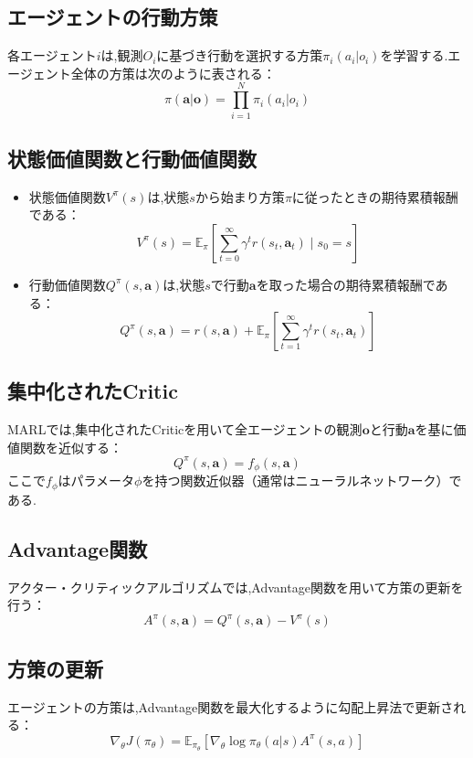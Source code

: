 \subsection*{エージェントの行動方策}
各エージェント$i$は,観測$O_i$に基づき行動を選択する方策$\pi_i(a_i | o_i)$を学習する.エージェント全体の方策は次のように表される：
\[
\pi(\boldsymbol{a} | \boldsymbol{o}) = \prod_{i=1}^N \pi_i(a_i | o_i)
\]

\subsection*{状態価値関数と行動価値関数}
\begin{itemize}
    \item 状態価値関数$V^\pi(s)$は,状態$s$から始まり方策$\pi$に従ったときの期待累積報酬である：
    \[
    V^\pi(s) = \mathbb{E}_\pi \left[ \sum_{t=0}^\infty \gamma^t r(s_t, \boldsymbol{a}_t) \mid s_0 = s \right]
    \]
    \item 行動価値関数$Q^\pi(s, \boldsymbol{a})$は,状態$s$で行動$\boldsymbol{a}$を取った場合の期待累積報酬である：
    \[
    Q^\pi(s, \boldsymbol{a}) = r(s, \boldsymbol{a}) + \mathbb{E}_\pi \left[ \sum_{t=1}^\infty \gamma^t r(s_t, \boldsymbol{a}_t) \right]
    \]
\end{itemize}

\subsection*{集中化されたCritic}
MARLでは,集中化されたCriticを用いて全エージェントの観測$\boldsymbol{o}$と行動$\boldsymbol{a}$を基に価値関数を近似する：
\[
Q^\pi(s, \boldsymbol{a}) = f_\phi(s, \boldsymbol{a})
\]
ここで$f_\phi$はパラメータ$\phi$を持つ関数近似器（通常はニューラルネットワーク）である.

\subsection*{Advantage関数}
アクター・クリティックアルゴリズムでは,Advantage関数を用いて方策の更新を行う：
\[
A^\pi(s, \boldsymbol{a}) = Q^\pi(s, \boldsymbol{a}) - V^\pi(s)
\]

\subsection*{方策の更新}
エージェントの方策は,Advantage関数を最大化するように勾配上昇法で更新される：
\[
\nabla_\theta J(\pi_\theta) = \mathbb{E}_{\pi_\theta} \left[ \nabla_\theta \log \pi_\theta(a | s) A^\pi(s, a) \right]
\]

